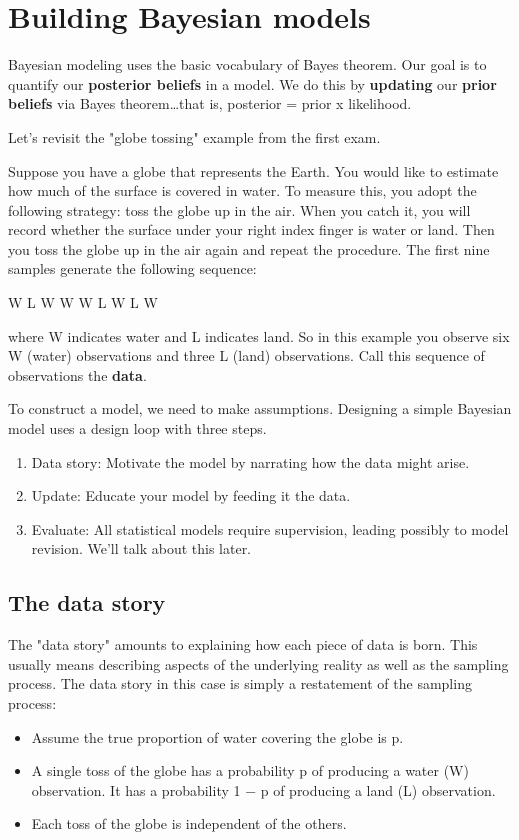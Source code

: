 \documentclass[11pt]{article}
\begin{document}
\section*{Building Bayesian models}
\label{sec-5}
Bayesian modeling uses the basic vocabulary of Bayes theorem.  Our goal is to quantify our \textbf{posterior beliefs} in a model.  We do this by \textbf{updating} our \textbf{prior beliefs} via Bayes theorem\ldots{}that is, posterior = prior x likelihood.

Let's revisit the "globe tossing" example from the first exam.

Suppose you have a globe that represents the Earth.  You would like to estimate how much of the surface is covered in water.  To measure this, you adopt the following strategy: toss the globe up in the air. When you catch it, you will record whether the surface under your right index finger is water or land.  Then you toss the globe up in the air again and repeat the procedure. The first nine samples generate the following sequence:

W L W W W L W L W

where W indicates water and L indicates land. So in this example you observe six W (water) observations and three L (land) observations. Call this sequence of observations the \textbf{data}.

To construct a model, we need to make assumptions.  Designing a simple Bayesian model uses a design loop with three steps.

\begin{enumerate}
\item Data story: Motivate the model by narrating how the data might arise.
\item Update: Educate your model by feeding it the data.
\item Evaluate: All statistical models require supervision, leading possibly to model revision.  We'll talk about this later.
\end{enumerate}

\subsection*{The data story}
\label{sec-5-1}
The "data story" amounts to explaining how each piece of data is born. This usually means describing aspects of the underlying reality as well as the sampling process. The data story in this case is simply a restatement of the sampling process:
\begin{itemize}
\item Assume the true proportion of water covering the globe is p.
\item A single toss of the globe has a probability p of producing a water (W) observation. It has a probability 1 − p of producing a land (L) observation.
\item Each toss of the globe is independent of the others.
\end{itemize}
\end{document}
